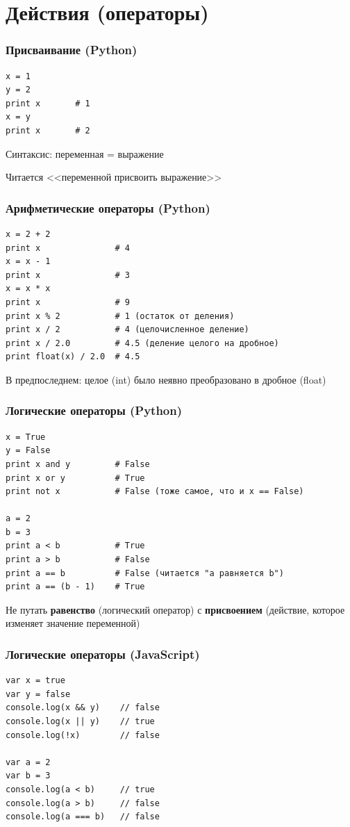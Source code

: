 {\section{Действия (операторы)}
\begin{frame}[fragile]
  \frametitle{Присваивание (Python)}
  \begin{verbatim}
x = 1
y = 2
print x       # 1
x = y
print x       # 2
  \end{verbatim}
Синтаксис: переменная = выражение

Читается <<переменной присвоить выражение>>
\end{frame}

\begin{frame}[fragile]
  \frametitle{Арифметические операторы (Python)}
  \begin{verbatim}
x = 2 + 2
print x               # 4
x = x - 1
print x               # 3
x = x * x
print x               # 9
print x % 2           # 1 (остаток от деления)
print x / 2           # 4 (целочисленное деление)
print x / 2.0         # 4.5 (деление целого на дробное)
print float(x) / 2.0  # 4.5
  \end{verbatim}
В предпоследнем: целое (int) было неявно преобразовано в дробное (float)
\end{frame}

\begin{frame}[fragile]
  \frametitle{Логические операторы (Python)}
  \begin{verbatim}
x = True
y = False
print x and y         # False
print x or y          # True
print not x           # False (тоже самое, что и x == False)

a = 2
b = 3
print a < b           # True
print a > b           # False
print a == b          # False (читается "a равняется b")
print a == (b - 1)    # True
  \end{verbatim}
  Не путать \textbf{равенство} (логический оператор) с \textbf{присвоением} (действие, которое изменяет значение переменной)
\end{frame}

\begin{frame}[fragile]
  \frametitle{Логические операторы (JavaScript)}
  \begin{verbatim}
var x = true
var y = false
console.log(x && y)    // false
console.log(x || y)    // true
console.log(!x)        // false

var a = 2
var b = 3
console.log(a < b)     // true
console.log(a > b)     // false
console.log(a === b)   // false
  \end{verbatim}
\end{frame}

}
